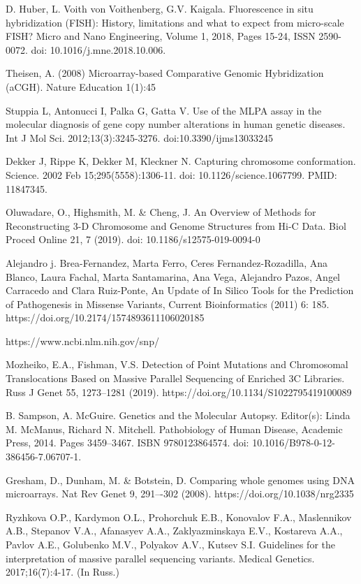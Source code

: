 \documentclass[a4paper,12pt]{article}
\begin{document}
\begin{thebibliography}{100}
D. Huber, L. Voith von Voithenberg, G.V. Kaigala. Fluorescence in situ hybridization (FISH): History, limitations and what to expect from micro-scale FISH? Micro and Nano Engineering, Volume 1, 2018, Pages 15-24, ISSN 2590-0072. doi: 10.1016/j.mne.2018.10.006.

Theisen, A. (2008) Microarray-based Comparative Genomic Hybridization (aCGH). Nature Education 1(1):45

Stuppia L, Antonucci I, Palka G, Gatta V. Use of the MLPA assay in the molecular diagnosis of gene copy number alterations in human genetic diseases. Int J Mol Sci. 2012;13(3):3245-3276. doi:10.3390/ijms13033245

Dekker J, Rippe K, Dekker M, Kleckner N. Capturing chromosome conformation. Science. 2002 Feb 15;295(5558):1306-11. doi: 10.1126/science.1067799. PMID: 11847345.

Oluwadare, O., Highsmith, M. \& Cheng, J. An Overview of Methods for Reconstructing 3-D Chromosome and Genome Structures from Hi-C Data. Biol Proced Online 21, 7 (2019). doi: 10.1186/s12575-019-0094-0

Alejandro j. Brea-Fernandez, Marta Ferro, Ceres Fernandez-Rozadilla, Ana Blanco, Laura Fachal, Marta Santamarina, Ana Vega, Alejandro Pazos, Angel Carracedo and Clara Ruiz-Ponte, An Update of In Silico Tools for the Prediction of Pathogenesis in Missense Variants, Current Bioinformatics (2011) 6: 185. https://doi.org/10.2174/1574893611106020185 

https://www.ncbi.nlm.nih.gov/snp/

Mozheiko, E.A., Fishman, V.S. Detection of Point Mutations and Chromosomal Translocations Based on Massive Parallel Sequencing of Enriched 3C Libraries. Russ J Genet 55, 1273–1281 (2019). https://doi.org/10.1134/S1022795419100089

B. Sampson, A. McGuire. Genetics and the Molecular Autopsy. Editor(s): Linda M. McManus, Richard N. Mitchell. Pathobiology of Human Disease, Academic Press, 2014. Pages 3459--3467. ISBN 9780123864574. doi: 10.1016/B978-0-12-386456-7.06707-1.

Gresham, D., Dunham, M. \& Botstein, D. Comparing whole genomes using DNA microarrays. Nat Rev Genet 9, 291–-302 (2008). https://doi.org/10.1038/nrg2335

Ryzhkova O.P., Kardymon O.L., Prohorchuk E.B., Konovalov F.A., Maslennikov A.B., Stepanov V.A., Afanasyev A.A., Zaklyazminskaya E.V., Kostareva A.A., Pavlov A.E., Golubenko M.V., Polyakov A.V., Kutsev S.I. Guidelines for the interpretation of massive parallel sequencing variants. Medical Genetics. 2017;16(7):4-17. (In Russ.) 


\end{thebibliography}
\end{document}
